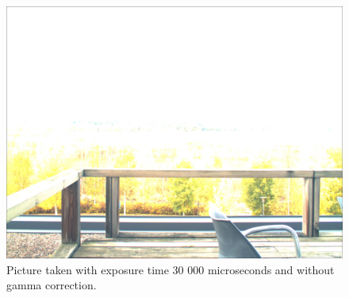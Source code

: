 \documentclass[english,12pt,a4paper,pdftex,elec,utf8]{aaltothesis}
\begin{document}
\begin{figure}[h!]
\includegraphics[scale=0.2]{def23}
\caption{Picture taken with exposure time 30 000 microseconds and without gamma correction.}
\end{figure}
\end{document}
